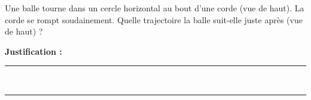 Une balle tourne dans un cercle horizontal au bout d'une corde (vue de haut). La corde se rompt soudainement. Quelle trajectoire la balle suit-elle juste après (vue de haut) ?

\choices

\noindent\textbf{Justification :} \hrulefill \\[2.5ex]
\rule{\linewidth}{0.4pt} \\[2.5ex]
\rule{\linewidth}{0.4pt}
\vfill
